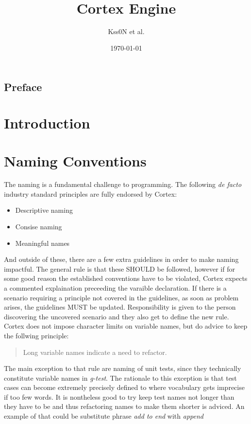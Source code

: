 \documentclass{report}
\title{Cortex Engine}
\author{Kss0N et al.}
\date{\today}
\begin{document}
\maketitle
\tableofcontents
\newpage

\section*{Preface}






\chapter{Introduction}



\chapter{Naming Conventions}
The naming is a fundamental challenge to programming. 
The following \textit{de facto} industry standard principles are fully endorsed by Cortex:
\begin{itemize}
    \item Descriptive naming
    \item Consise naming
    \item Meaningful names
\end{itemize}
And outside of these, there are a few extra guidelines in order to make naming impactful.
The general rule is that these SHOULD be followed, however if for some good reason the established conventions have to be violated, Cortex expects a commented explaination preceeding the varaible declaration.
If there is a scenario requiring a principle not covered in the guidelines, as soon as problem arises, the guidelines MUST be updated.
Responsibility is given to the person discovering the uncovered scenario and they also get to define the new rule.
Cortex does not impose character limits on variable names, but do advice to keep the follwing principle:
\begin{quote}
    Long variable names indicate a need to refactor.
\end{quote}
The main exception to that rule are naming of unit tests, since they technically constitute variable names in \emph{g-test}.
The rationale to this exception is that test cases can become extremely precisely defined to where vocabulary gets imprecise if too few words.
It is nontheless good to try keep test names not longer than they have to be and thus refactoring names to make them shorter is adviced.
An example of that could be substitute phrase \emph{add to end} with \emph{append}
\end{document}
